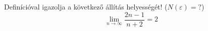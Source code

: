 \documentclass[11pt]{scrartcl}
\begin{document}
Definícióval igazolja a következő állítás helyességét! ($N(\varepsilon) = ?$)
\[
	\lim_{n \to \infty} \frac{2n - 1}{n + 2} = 2
\]
\end{document}
